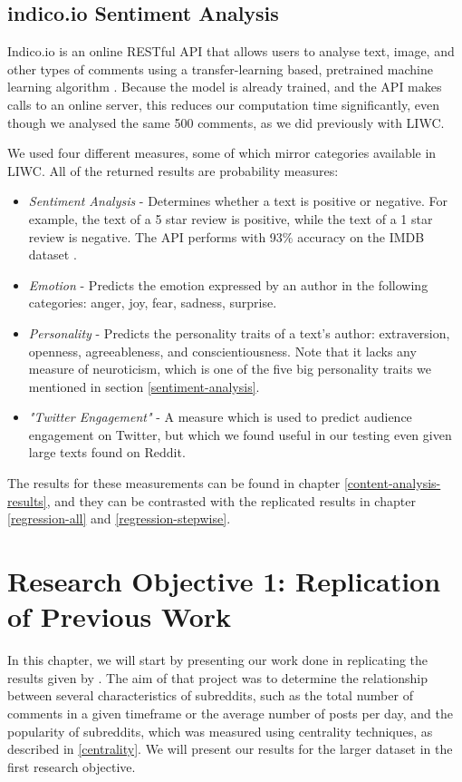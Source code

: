 \documentclass[bsc,frontabs,twoside,singlespacing,parskip,deptreport]{infthesis}
\begin{document}
\section{indico.io Sentiment Analysis}\label{indico}

Indico.io is an online RESTful API that allows users to analyse text, image, and other types of comments using a transfer-learning based, pretrained machine learning algorithm \cite{indico}. Because the model is already trained, and the API makes calls to an online server, this reduces our computation time significantly, even though we analysed the same 500 comments, as we did previously with LIWC.

We used four different measures, some of which mirror categories available in LIWC. All of the returned results are probability measures:

\begin{itemize}
	\item \textit{Sentiment Analysis} - Determines whether a text is positive or negative. For example, the text of a 5 star review is positive, while the text of a 1 star review is negative. The API performs with 93\% accuracy on the IMDB dataset \cite{indico}.
	\item \textit{Emotion} - Predicts the emotion expressed by an author in the following categories: anger, joy, fear, sadness, surprise.
	\item \textit{Personality} - Predicts the personality traits of a text's author: extraversion, openness, agreeableness, and conscientiousness. Note that it lacks any measure of neuroticism, which is one of the five big personality traits we mentioned in section \ref{sentiment-analysis}.
	\item \textit{"Twitter Engagement"} - A measure which is used to predict audience engagement on Twitter, but which we found useful in our testing even given large texts found on Reddit.
\end{itemize}

The results for these measurements can be found in chapter \ref{content-analysis-results}, and they can be contrasted with the replicated results in chapter \ref{regression-all} and \ref{regression-stepwise}.

\chapter{Research Objective 1: Replication of Previous Work}\label{results}

In this chapter, we will start by presenting our work done in replicating the results given by \cite{masters}. The aim of that project was to determine the relationship between several characteristics of subreddits, such as the total number of comments in a given timeframe or the average number of posts per day, and the popularity of subreddits, which was measured using centrality techniques, as described in \ref{centrality}. We will present our results for the larger dataset in the first research objective.
\end{document}
